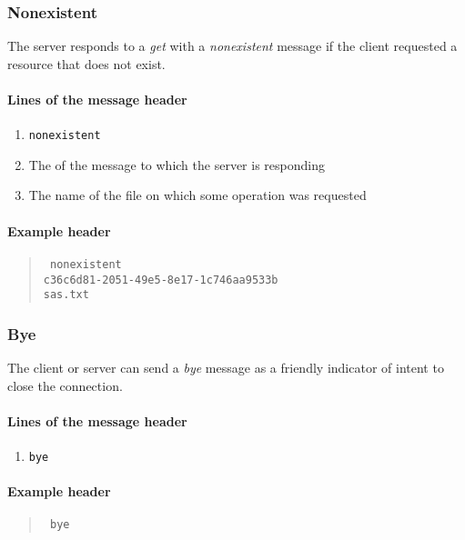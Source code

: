 \documentclass[10pt]{article}
\begin{document}
\subsubsection{Nonexistent}

The server responds to a \textit{get} with a \textit{nonexistent} message
if the client requested a resource that does not exist.

\paragraph{Lines of the message header}
\begin{enumerate}
\item \texttt{nonexistent}
\item The  of the message to which the server is responding
\item The name of the file on which some operation was requested
\end{enumerate}

\paragraph{Example header}
\begin{quote}
\texttt{%
nonexistent \\
c36c6d81-2051-49e5-8e17-1c746aa9533b \\
sas.txt
}
\end{quote}

\subsubsection{Bye}

The client or server can send a \textit{bye} message as a friendly indicator
of intent to close the connection.

\paragraph{Lines of the message header}
\begin{enumerate}
\item \texttt{bye}
\end{enumerate}

\paragraph{Example header}
\begin{quote}
\texttt{%
bye
}
\end{quote}
\end{document}
